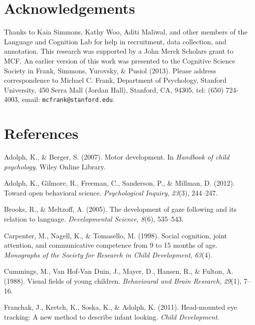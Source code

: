 \documentclass[10pt, letterpaper]{article}
\begin{document}
\section{Acknowledgements}\label{acknowledgements}

Thanks to Kaia Simmons, Kathy Woo, Aditi Maliwal, and other members of
the Language and Cognition Lab for help in recruitment, data collection,
and annotation. This research was supported by a John Merck Scholars
grant to MCF. An earlier version of this work was presented to the
Cognitive Science Society in Frank, Simmons, Yurovsky, \& Pusiol (2013).
Please address correspondence to Michael C. Frank, Department of
Psychology, Stanford University, 450 Serra Mall (Jordan Hall), Stanford,
CA, 94305, tel: (650) 724-4003, email: \texttt{mcfrank@stanford.edu}.

\section{References}\label{references}

\setlength{\parindent}{-0.1in} \setlength{\leftskip}{0.125in} \noindent

\hypertarget{refs}{}
\hypertarget{ref-adolph2007}{}
Adolph, K., \& Berger, S. (2007). Motor development. In \emph{Handbook
of child psychology}. Wiley Online Library.

\hypertarget{ref-adolph2012}{}
Adolph, K., Gilmore, R., Freeman, C., Sanderson, P., \& Millman, D.
(2012). Toward open behavioral science. \emph{Psychological Inquiry},
\emph{23}(3), 244--247.

\hypertarget{ref-brooks2005}{}
Brooks, R., \& Meltzoff, A. (2005). The development of gaze following
and its relation to language. \emph{Developmental Science}, \emph{8}(6),
535--543.

\hypertarget{ref-carpenter1998}{}
Carpenter, M., Nagell, K., \& Tomasello, M. (1998). Social cognition,
joint attention, and communicative competence from 9 to 15 months of
age. \emph{Monographs of the Society for Research in Child Development},
\emph{63}(4).

\hypertarget{ref-cummings1988}{}
Cummings, M., Van Hof-Van Duin, J., Mayer, D., Hansen, R., \& Fulton, A.
(1988). Visual fields of young children. \emph{Behavioural and Brain
Research}, \emph{29}(1), 7--16.

\hypertarget{ref-franchak2011}{}
Franchak, J., Kretch, K., Soska, K., \& Adolph, K. (2011). Head-mounted
eye tracking: A new method to describe infant looking. \emph{Child
Development}.
\end{document}
